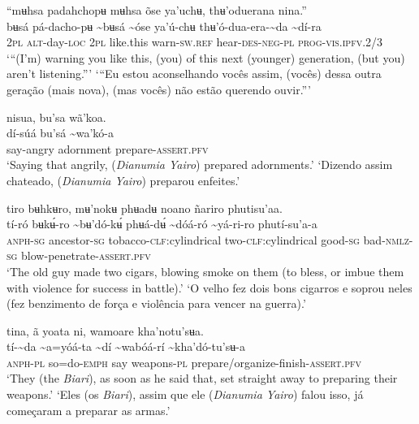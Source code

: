 \documentclass[output=paper,
modfonts,nonflat
]{langsci/langscibook}
\begin{document}
\ea “mʉhsa padahchopʉ mʉhsa õse ya'uchʉ, thʉ'oduerana nina.” \\[.3em]
\gll {\textasciitilde}bʉsá	pá-dacho-pʉ	{\textasciitilde}bʉsá	{\textasciitilde}óse	ya'ú-chʉ	thʉ'ó-dua-era-{\textasciitilde}da	{\textasciitilde}dí-ra \\
     2\textsc{pl}	\textsc{alt}-day-\textsc{loc}	2\textsc{pl}	like.this 	warn\textsc{-sw.ref}	hear-\textsc{des-neg-pl}	\textsc{prog-vis.ipfv.}2/3\\
\glt ‘“(I’m) warning you like this, (you) of this next (younger) generation, (but you) aren't listening.”’
\glt ‘“Eu estou aconselhando vocês assim, (vocês) dessa outra geração (mais nova), (mas vocês) não estão querendo ouvir.”’
\z 

\ea nisua, bu'sa wã'koa. \\[.3em]
\gll {\textasciitilde}dí-súá	bu'sá	{\textasciitilde}wa'kó-a \\
     say-angry	adornment	prepare-\textsc{assert.pfv} \\
\glt ‘Saying that angrily, (\textit{Dianumia Yairo}) prepared adornments.'
\glt ‘Dizendo assim chateado, (\textit{Dianumia Yairo}) preparou enfeites.'
\z 

\ea tiro bʉhkʉro, mʉ'nokʉ phʉadʉ noano ñariro phutisu'aa. \\[.3em]
\gll tí-ró	bʉkʉ́-ro	{\textasciitilde}bʉ'dó-kʉ́	phʉá-dʉ́	{\textasciitilde}dóá-ró	{\textasciitilde}yá-ri-ro	phutí-su'a-a \\
     \textsc{anph-sg}	ancestor\textsc{-sg}	tobacco-\textsc{clf:}cylindrical	two-\textsc{clf:}cylindrical	good\textsc{-sg}	bad\textsc{-nmlz-sg}	blow-penetrate-\textsc{assert.pfv}\\
\glt ‘The old guy made two cigars, blowing smoke on them (to bless, or imbue them with violence for success in battle).’
\glt ‘O velho fez dois bons cigarros e soprou neles (fez benzimento de força e violência para vencer na guerra).’
\z 

\ea tina, ã yoata ni, wamoare kha'notu'sʉa. \\[.3em]
\gll tí-{\textasciitilde}da	{\textasciitilde}a=yóá-ta	{\textasciitilde}dí	{\textasciitilde}wabóá-rí	{\textasciitilde}kha'dó-tu'sʉ-a \\
     \textsc{anph-pl}	so=do-\textsc{emph}	say	weapons-\textsc{pl}	prepare/organize-finish-\textsc{assert.pfv}\\
\glt ‘They (the \textit{Biari}), as soon as he said that, set straight away to preparing their weapons.’
\glt ‘Eles (os \textit{Biari}), assim que ele (\textit{Dianumia Yairo}) falou isso, já começaram a preparar as armas.’
\z 
\end{document}
